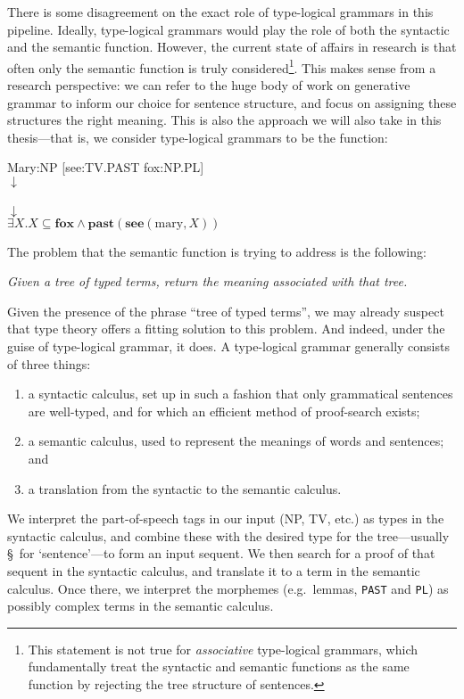 There is some disagreement on the exact role of type-logical grammars in
this pipeline. Ideally, type-logical grammars would play the role of
both the syntactic and the semantic function. However, the current
state of affairs in research is that often only the semantic function
is truly considered\footnote{%
  This statement is not true for \emph{associative} type-logical
  grammars, which fundamentally treat the syntactic and semantic
  functions as the same function by rejecting the tree structure of
  sentences.
}. This makes sense from a research perspective: we can refer to the
huge body of work on generative grammar to inform our choice for
sentence structure, and focus on assigning these structures the right
meaning. This is also the approach we will also take in this
thesis---that is, we consider type-logical grammars to be the function:
\begin{center}
  Mary:NP [see:TV.PAST fox:NP.PL]\\
  $\downarrow$\\
  \\
  $\downarrow$\\
  $\exists X.X\subseteq\mathbf{fox}\land\mathbf{past}(\mathbf{see}(\text{mary},X))$
\end{center}
The problem that the semantic function is trying to address is the
following:
\begin{center}\itshape
  Given a tree of typed terms, return the meaning associated with that tree.
\end{center}
Given the presence of the phrase ``tree of typed terms'', we may
already suspect that type theory offers a fitting solution to this
problem. And indeed, under the guise of type-logical grammar, it
does. A type-logical grammar generally consists of three things:
\begin{enumerate}[label=(\arabic*)]
\item a syntactic calculus, set up in such a fashion that only
  grammatical sentences are well-typed, and for which an efficient
  method of proof-search exists;
\item a semantic calculus, used to represent the meanings of words and
  sentences; and
\item a translation from the syntactic to the semantic calculus.
\end{enumerate}
We interpret the part-of-speech tags in our input (NP, TV, etc.) as
types in the syntactic calculus, and combine these with the desired
type for the tree---usually \S\ for `sentence'---to form an input
sequent.
We then search for a proof of that sequent in the syntactic calculus,
and translate it to a term in the semantic calculus.
Once there, we interpret the morphemes (e.g.\ lemmas, \texttt{PAST}
and \texttt{PL}) as possibly complex terms in the semantic calculus.

